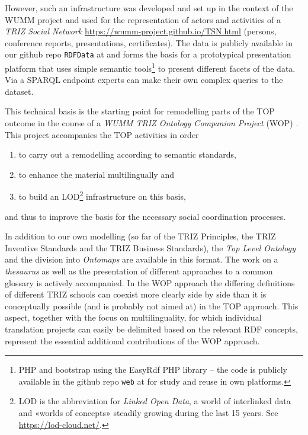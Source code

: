 \documentclass[11pt,a4paper]{article}
\begin{document}
However, such an infrastructure was developed and set up in the context of the
WUMM project \cite{WUMM-pages} and used for the representation of actors and
activities of a \emph{TRIZ Social Network}
\url{https://wumm-project.github.io/TSN.html} (persons, conference reports,
presentations, certificates). The data is publicly available in our github
repo \texttt{RDFData} at \cite{WUMM-github} and forms the basis for a
prototypical presentation platform \cite{WUMM-web} that uses simple semantic
tools\footnote{PHP and bootstrap using the EasyRdf PHP library -- the code is
  publicly available in the github repo \texttt{web} at \cite{WUMM-github} for
  study and reuse in own platforms.} to present different facets of the
data. Via a SPARQL endpoint \cite{WUMM-sparql} experts can make their own
complex queries to the dataset.

This technical basis is the starting point for remodelling parts of the TOP
outcome in the course of a \emph{WUMM TRIZ Ontology Companion Project} (WOP)
\cite{WOP}.  This project accompanies the TOP activities in order
\begin{enumerate}[noitemsep]
\item to carry out a remodelling according to semantic standards,
\item to enhance the material multilingually and
\item to build an LOD\footnote{LOD is the abbreviation for \emph{Linked Open
    Data}, a world of interlinked data and «worlds of concepts» steadily
  growing during the last 15 years. See \url{https://lod-cloud.net/}.  }
  infrastructure on this basis,
\end{enumerate}
and thus to improve the basis for the necessary social coordination processes.

In addition to our own modelling (so far of the TRIZ Principles, the TRIZ
Inventive Standards and the TRIZ Business Standards), the \emph{Top Level
  Ontology} and the division into \emph{Ontomaps} are available in this
format. The work on a \emph{thesaurus} as well as the presentation of
different approaches to a common glossary is actively accompanied. In the WOP
approach the differing definitions of different TRIZ schools can coexist more
clearly side by side than it is conceptually possible (and is probably not
aimed at) in the TOP approach. This aspect, together with the focus on
multilinguality, for which individual translation projects can easily be
delimited based on the relevant RDF concepts, represent the essential
additional contributions of the WOP approach.
\end{document}
